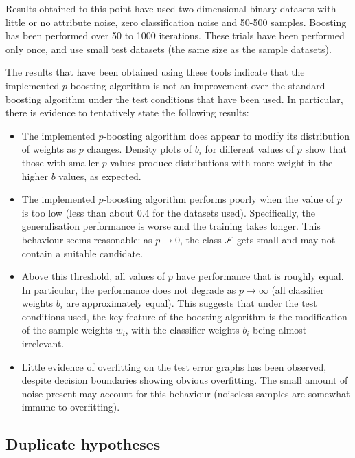 Results obtained to this point have used two-dimensional binary datasets with
little or no attribute noise, zero classification noise and 50-500
samples.  Boosting has been performed over 50 to 1000 iterations.
These trials have been performed only once, and use small test
datasets (the same size as the sample datasets).

The results that have been obtained using these tools indicate that
the implemented $p$-boosting algorithm is not an
improvement over the standard boosting algorithm under the test
conditions that have been used.  In particular, there is evidence to
tentatively state the following results:

\begin{itemize}

\item	The implemented $p$-boosting algorithm does appear to modify its
	distribution of weights as $p$ changes.  Density plots of
	$b_i$ for different values of $p$ show that those with smaller
	$p$ values produce distributions with more weight in the
	higher $b$ values, as expected.

\item	The implemented $p$-boosting algorithm performs poorly when
	the value of 
	$p$ is too low (less than about 0.4 for the datasets used).
	Specifically, the generalisation performance is worse and the
	training takes longer.  This behaviour seems reasonable: as $p
	\rightarrow 0$, the class $\mathcal{F}$ gets small and may not contain a
	suitable candidate.

\item	Above this threshold, all values of $p$ have performance that
	is roughly equal.  In particular, the performance does not
	degrade as $p \rightarrow \infty$ (all classifier weights
	$b_i$ are approximately equal).  This suggests that under the
	test conditions used, the key feature of the boosting
	algorithm is the modification of the sample weights $w_i$,
	with the classifier weights $b_i$ being almost irrelevant.

\item	Little evidence of overfitting on the test error graphs has
	been observed, despite decision boundaries showing obvious
	overfitting.  The small amount of noise present may account
	for this behaviour (noiseless samples are somewhat immune to
	overfitting).

\end{itemize}

\subsection{Duplicate hypotheses}
\label{sec:duplicate hypotheses}

